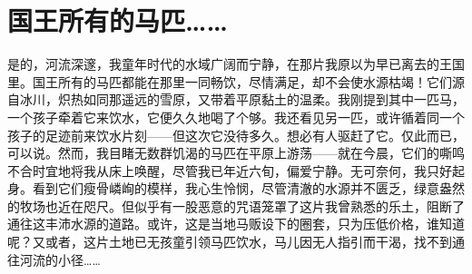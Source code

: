 
\section{国王所有的马匹……}

是的，河流深邃，我童年时代的水域广阔而宁静，在那片我原以为早已离去的王国里。国王所有的马匹都能在那里一同畅饮，尽情满足，却不会使水源枯竭！它们源自冰川，炽热如同那遥远的雪原，又带着平原黏土的温柔。我刚提到其中一匹马，一个孩子牵着它来饮水，它便久久地喝了个够。我还看见另一匹，或许循着同一个孩子的足迹前来饮水片刻——但这次它没待多久。想必有人驱赶了它。仅此而已，可以说。然而，我目睹无数群饥渴的马匹在平原上游荡——就在今晨，它们的嘶鸣不合时宜地将我从床上唤醒，尽管我已年近六旬，偏爱宁静。无可奈何，我只好起身。看到它们瘦骨嶙峋的模样，我心生怜悯，尽管清澈的水源并不匮乏，绿意盎然的牧场也近在咫尺。但似乎有一股恶意的咒语笼罩了这片我曾熟悉的乐土，阻断了通往这丰沛水源的道路。或许，这是当地马贩设下的圈套，只为压低价格，谁知道呢？又或者，这片土地已无孩童引领马匹饮水，马儿因无人指引而干渴，找不到通往河流的小径……